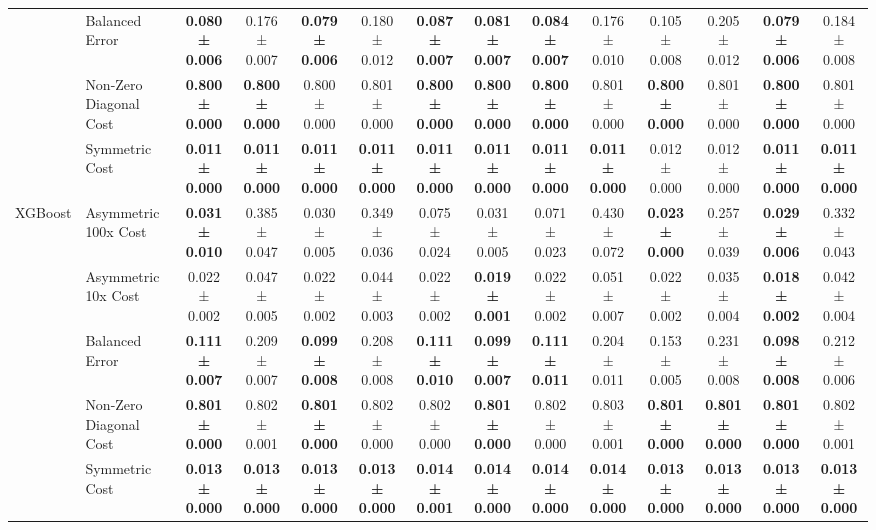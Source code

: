 \begin{table}[H]
{\begin{tabular}{llcccccccccccc}
 & Balanced Error & \textbf{0.080 ± 0.006} & 0.176 ± 0.007 & \textbf{0.079 ± 0.006} & 0.180 ± 0.012 & \textbf{0.087 ± 0.007} & \textbf{0.081 ± 0.007} & \textbf{0.084 ± 0.007} & 0.176 ± 0.010 & 0.105 ± 0.008 & 0.205 ± 0.012 & \textbf{0.079 ± 0.006} & 0.184 ± 0.008 \\
 & Non-Zero Diagonal Cost & \textbf{0.800 ± 0.000} & \textbf{0.800 ± 0.000} & 0.800 ± 0.000 & 0.801 ± 0.000 & \textbf{0.800 ± 0.000} & \textbf{0.800 ± 0.000} & \textbf{0.800 ± 0.000} & 0.801 ± 0.000 & \textbf{0.800 ± 0.000} & 0.801 ± 0.000 & \textbf{0.800 ± 0.000} & 0.801 ± 0.000 \\
 & Symmetric Cost & \textbf{0.011 ± 0.000} & \textbf{0.011 ± 0.000} & \textbf{0.011 ± 0.000} & \textbf{0.011 ± 0.000} & \textbf{0.011 ± 0.000} & \textbf{0.011 ± 0.000} & \textbf{0.011 ± 0.000} & \textbf{0.011 ± 0.000} & 0.012 ± 0.000 & 0.012 ± 0.000 & \textbf{0.011 ± 0.000} & \textbf{0.011 ± 0.000} \\
\cline{1-14}
\multirow[t]{5}{*}{XGBoost} & Asymmetric 100x Cost & \textbf{0.031 ± 0.010} & 0.385 ± 0.047 & 0.030 ± 0.005 & 0.349 ± 0.036 & 0.075 ± 0.024 & 0.031 ± 0.005 & 0.071 ± 0.023 & 0.430 ± 0.072 & \textbf{0.023 ± 0.000} & 0.257 ± 0.039 & \textbf{0.029 ± 0.006} & 0.332 ± 0.043 \\
 & Asymmetric 10x Cost & 0.022 ± 0.002 & 0.047 ± 0.005 & 0.022 ± 0.002 & 0.044 ± 0.003 & 0.022 ± 0.002 & \textbf{0.019 ± 0.001} & 0.022 ± 0.002 & 0.051 ± 0.007 & 0.022 ± 0.002 & 0.035 ± 0.004 & \textbf{0.018 ± 0.002} & 0.042 ± 0.004 \\
 & Balanced Error & \textbf{0.111 ± 0.007} & 0.209 ± 0.007 & \textbf{0.099 ± 0.008} & 0.208 ± 0.008 & \textbf{0.111 ± 0.010} & \textbf{0.099 ± 0.007} & \textbf{0.111 ± 0.011} & 0.204 ± 0.011 & 0.153 ± 0.005 & 0.231 ± 0.008 & \textbf{0.098 ± 0.008} & 0.212 ± 0.006 \\
 & Non-Zero Diagonal Cost & \textbf{0.801 ± 0.000} & 0.802 ± 0.001 & \textbf{0.801 ± 0.000} & 0.802 ± 0.000 & 0.802 ± 0.000 & \textbf{0.801 ± 0.000} & 0.802 ± 0.000 & 0.803 ± 0.001 & \textbf{0.801 ± 0.000} & \textbf{0.801 ± 0.000} & \textbf{0.801 ± 0.000} & 0.802 ± 0.001 \\
 & Symmetric Cost & \textbf{0.013 ± 0.000} & \textbf{0.013 ± 0.000} & \textbf{0.013 ± 0.000} & \textbf{0.013 ± 0.000} & \textbf{0.014 ± 0.001} & \textbf{0.014 ± 0.000} & \textbf{0.014 ± 0.000} & \textbf{0.014 ± 0.000} & \textbf{0.013 ± 0.000} & \textbf{0.013 ± 0.000} & \textbf{0.013 ± 0.000} & \textbf{0.013 ± 0.000} \\
\cline{1-14}
\bottomrule
\end{tabular}
    }
\end{table}
